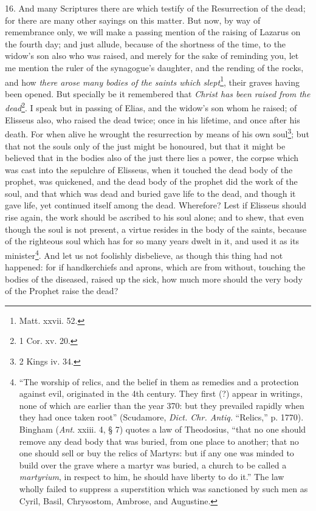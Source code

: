 16. And many Scriptures there are which testify of the Resurrection of the dead; for there are many other sayings on this matter. But now, by way of remembrance only, we will make a passing mention of the raising of Lazarus on the fourth day; and just allude, because of the shortness of the time, to the widow’s son also who was raised, and merely for the sake of reminding you, let me mention the ruler of the synagogue’s daughter, and the rending of the rocks, and how \emph{there arose many bodies of the saints which slept}\footnote{Matt. xxvii. 52.}, their graves having been opened. But specially be it remembered that \emph{Christ has been raised from the dead}\footnote{1 Cor. xv. 20.}. I speak but in passing of Elias, and the widow’s son whom he raised; of Elisseus also, who raised the dead twice; once in his lifetime, and once after his death. For when alive he wrought the resurrection by means of his own soul\footnote{2 Kings iv. 34.}; but that not the souls only of the just might be honoured, but that it might be believed that in the bodies also of the just there lies a power, the corpse which was cast into the sepulchre of Elisseus, when it touched the dead body of the prophet, was quickened, and the dead body of the prophet did the work of the soul, and that which was dead and buried gave life to the dead, and though it gave life, yet continued itself among the dead. Wherefore? Lest if Elisseus should rise again, the work should be ascribed to his soul alone; and to shew, that even though the soul is not present, a virtue resides in the body of the saints, because of the righteous soul which has for so many years dwelt in it, and used it as its minister\footnote{“The worship of relics, and the belief in them as remedies and a protection against evil, originated in the 4th century. They first (?) appear in writings, none of which are earlier than the year 370: but they prevailed rapidly when they had once taken root” (Scudamore, \emph{Dict. Chr. Antiq.} “Relics,” p. 1770). Bingham (\emph{Ant}. xxiii. 4, § 7) quotes a law of Theodosius, “that no one should remove any dead body that was buried, from one place to another; that no one should sell or buy the relics of Martyrs: but if any one was minded to build over the grave where a martyr was buried, a church to be called a \emph{martyrium}, in respect to him, he should have liberty to do it.” The law wholly failed to suppress a superstition which was sanctioned by such men as Cyril, Basil, Chrysostom, Ambrose, and Augustine.}. And let us not foolishly disbelieve, as though this thing had not happened: for if handkerchiefs and aprons, which are from without, touching the bodies of the diseased, raised up the sick, how much more should the very body of the Prophet raise the dead?

